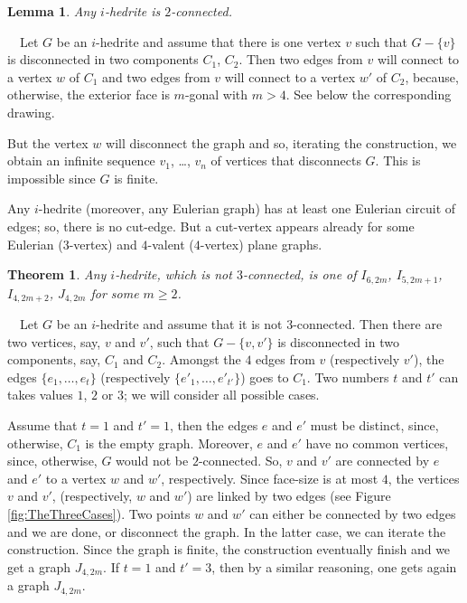 \documentclass[12pt]{article}
\newtheorem{theorem}{Theorem}
\newtheorem{lemma}{Lemma}
\newcommand{\proof}{\noindent{\bf Proof.}\ \ }
\begin{document}
\begin{lemma}
Any $i$-hedrite is $2$-connected.
\end{lemma}
\proof Let $G$ be an $i$-hedrite and assume that there is one vertex $v$ such that $G-\{v\}$ is disconnected in two components $C_1$, $C_2$. Then two edges from $v$ will connect to a vertex $w$ of $C_1$ and two edges from $v$ will connect to a vertex $w'$ of $C_2$, because, otherwise, the exterior face is $m$-gonal with $m>4$. See below the corresponding drawing.

\begin{center}
\epsfxsize=60mm
\end{center}

But the vertex $w$ will disconnect the graph and so, iterating the construction, we obtain an infinite sequence $v_1$, \dots, $v_n$ of vertices that disconnects $G$. 
This is impossible since $G$ is finite.


Any $i$-hedrite (moreover, any Eulerian graph) has at least one 
Eulerian circuit of edges; so, there is no cut-edge.
But a cut-vertex appears already for some Eulerian ($3$-vertex)
and $4$-valent ($4$-vertex) plane graphs.


\begin{theorem}\label{3-connectedness}
Any $i$-hedrite, which is not $3$-connected, is one of $I_{6,2m}$, $I_{5, 2m+1}$, $I_{4, 2m+2}$, $J_{4, 2m}$ for some $m\geq 2$.


\end{theorem}

\proof Let $G$ be an $i$-hedrite and assume that it is not $3$-connected. 
Then there are two vertices, say, $v$ and $v'$, such that 
$G-\{v, v'\}$ is disconnected in two components, say, $C_1$ and $C_2$.
Amongst the $4$ edges from $v$ (respectively $v'$), the edges 
$\{e_1,\dots, e_{t}\}$ (respectively $\{e'_1,\dots, e'_{t'}\}$) goes
to $C_1$. Two numbers $t$ and $t'$ can takes values $1$, $2$ or $3$; we
will consider all possible cases.

Assume that $t=1$ and $t'=1$, then the edges $e$ and $e'$ must be
distinct, since, otherwise, $C_1$ is the empty graph. Moreover, $e$ and
$e'$ have no common vertices, since, otherwise, $G$ would not be $2$-connected.
So, $v$ and $v'$ are connected by $e$ and $e'$ to a vertex $w$ and $w'$,
respectively. Since face-size is at most $4$, the vertices $v$ and $v'$,
(respectively, $w$ and $w'$) are linked by two edges
(see Figure \ref{fig:TheThreeCases}).
Two points $w$ and $w'$ can either be connected by two edges and
we are done, or disconnect the graph. In the latter case, we can iterate
the construction. Since the graph is finite, the construction eventually
finish and we get a graph $J_{4,2m}$. If $t=1$ and
$t'=3$, then by a similar reasoning, one gets again a graph $J_{4,2m}$.
\end{document}
